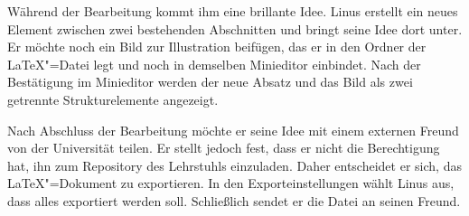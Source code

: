 Während der Bearbeitung kommt ihm eine brillante Idee.
Linus erstellt ein neues Element zwischen zwei bestehenden Abschnitten und bringt seine Idee dort unter.
Er möchte noch ein Bild zur Illustration beifügen, das er in den Ordner der \LaTeX"=Datei legt und noch in demselben
Minieditor einbindet.
Nach der Bestätigung im Minieditor werden der neue Absatz und das Bild als zwei getrennte Strukturelemente angezeigt.

Nach Abschluss der Bearbeitung möchte er seine Idee mit einem externen Freund von der Universität teilen.
Er stellt jedoch fest, dass er nicht die Berechtigung hat, ihn zum Repository des Lehrstuhls einzuladen.
Daher entscheidet er sich, das \LaTeX"=Dokument zu exportieren.
In den Exporteinstellungen wählt Linus aus, dass alles exportiert werden soll.
Schließlich sendet er die Datei an seinen Freund.
